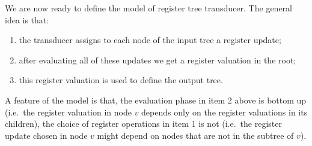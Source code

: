 We are now ready to define the model of register tree transducer. The general idea is that:
\begin{enumerate}
    \item the transducer assigns to each node of the input tree a register update;
    \item  after evaluating all of these updates we get a register valuation in the root;
    \item this register valuation is used to define the output tree.
\end{enumerate}
 A feature of the model is that, the evaluation phase in item 2 above is bottom up (i.e.~the register valuation in  node $v$ depends only on the register valuations in its children), the choice of register operations in item 1 is not  (i.e.~the register update chosen in node  $v$ might depend on nodes  that are not in the subtree of $v$). 

